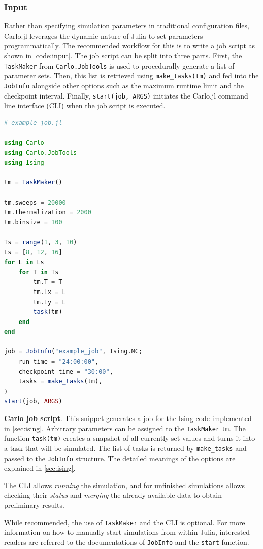 \documentclass{SciPost}
\begin{document}
\subsubsection{Input}
Rather than specifying simulation parameters in traditional configuration files, Carlo.jl leverages the dynamic nature of Julia to set parameters programmatically. The recommended workflow for this is to write a job script as shown in \cref{code:input}. The job script can be split into three parts. First, the \texttt{TaskMaker} from \texttt{Carlo.JobTools} is used to procedurally generate a list of parameter sets. Then, this list is retrieved using \texttt{make\_{}tasks(tm)} and fed into the \texttt{JobInfo} alongside other options such as the maximum runtime limit and the checkpoint interval. Finally, \texttt{start(job, ARGS)} initiates the Carlo.jl command line interface (CLI) when the job script is executed.
\begin{lstfloat}
\begin{lstlisting}[language=julia]
# example_job.jl

using Carlo
using Carlo.JobTools
using Ising

tm = TaskMaker()

tm.sweeps = 20000
tm.thermalization = 2000
tm.binsize = 100

Ts = range(1, 3, 10)
Ls = [8, 12, 16]
for L in Ls
    for T in Ts
        tm.T = T
        tm.Lx = L
        tm.Ly = L
        task(tm)
    end
end

job = JobInfo("example_job", Ising.MC;
    run_time = "24:00:00",
    checkpoint_time = "30:00",
    tasks = make_tasks(tm),
)
start(job, ARGS)
\end{lstlisting}
\caption{\textbf{Carlo job script}. This snippet generates a job for the Ising code implemented in \cref{sec:ising}. Arbitrary parameters can be assigned to the \texttt{TaskMaker} \texttt{tm}. The function \texttt{task(tm)} creates a snapshot of all currently set values and turns it into a task that will be simulated. The list of tasks is returned by \texttt{make\_{}tasks} and passed to the \texttt{JobInfo} structure. The detailed meanings of the options are explained in \cref{sec:ising}.}
\label{code:input}
\end{lstfloat}

The CLI allows \textit{running} the simulation, and for unfinished simulations allows checking their \textit{status} and \textit{merging} the already available data to obtain preliminary results. 

While recommended, the use of \texttt{TaskMaker} and the CLI is optional. For more information on how to manually start simulations from within Julia, interested readers are referred to the documentations of \texttt{JobInfo} and the \texttt{start} function.
\end{document}
